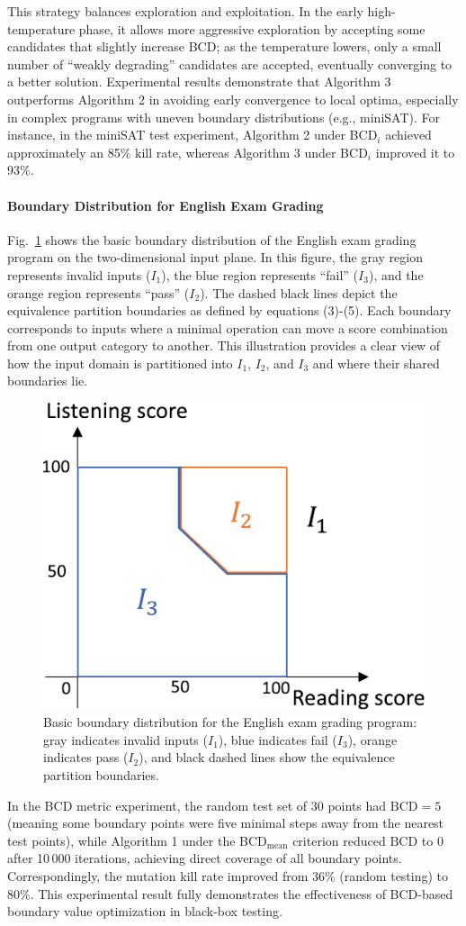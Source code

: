 \documentclass[manuscript,screen,review]{acmart}
\begin{document}
This strategy balances exploration and exploitation. In the early high-temperature phase, it allows more aggressive exploration by accepting some candidates that slightly increase BCD; as the temperature lowers, only a small number of ``weakly degrading'' candidates are accepted, eventually converging to a better solution. Experimental results demonstrate that Algorithm 3 outperforms Algorithm 2 in avoiding early convergence to local optima, especially in complex programs with uneven boundary distributions (e.g., miniSAT). For instance, in the miniSAT test experiment, Algorithm 2 under BCD$_{i}$ achieved approximately an 85\% kill rate, whereas Algorithm 3 under BCD$_{i}$ improved it to 93\%.

\paragraph{Boundary Distribution for English Exam Grading}  
Fig.~\ref{fig:english_boundary} shows the basic boundary distribution of the English exam grading program on the two-dimensional input plane. In this figure, the gray region represents invalid inputs ($I_1$), the blue region represents ``fail'' ($I_3$), and the orange region represents ``pass'' ($I_2$). The dashed black lines depict the equivalence partition boundaries as defined by equations (3)-(5). Each boundary corresponds to inputs where a minimal operation can move a score combination from one output category to another. This illustration provides a clear view of how the input domain is partitioned into $I_1$, $I_2$, and $I_3$ and where their shared boundaries lie.

\begin{figure}[htb]
  \centering
  \includegraphics[width=0.3\linewidth]{./picture/1.pdf}
  \caption{Basic boundary distribution for the English exam grading program: gray indicates invalid inputs ($I_1$), blue indicates fail ($I_3$), orange indicates pass ($I_2$), and black dashed lines show the equivalence partition boundaries.}
  \label{fig:english_boundary}
\end{figure}

In the BCD metric experiment, the random test set of 30 points had $\mathrm{BCD} = 5$ (meaning some boundary points were five minimal steps away from the nearest test points), while Algorithm 1 under the BCD$_{\mathrm{mean}}$ criterion reduced $\mathrm{BCD}$ to 0 after 10\,000 iterations, achieving direct coverage of all boundary points. Correspondingly, the mutation kill rate improved from 36\% (random testing) to 80\%. This experimental result fully demonstrates the effectiveness of BCD-based boundary value optimization in black-box testing.
\end{document}
